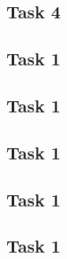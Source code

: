 \documentclass[a4paper,12pt]{article}
\begin{document}
\subsection{Task 4}


\subsection{Task 1}
\subsection{Task 1}
\subsection{Task 1}
\subsection{Task 1}\subsection{Task 1}
\end{document}
